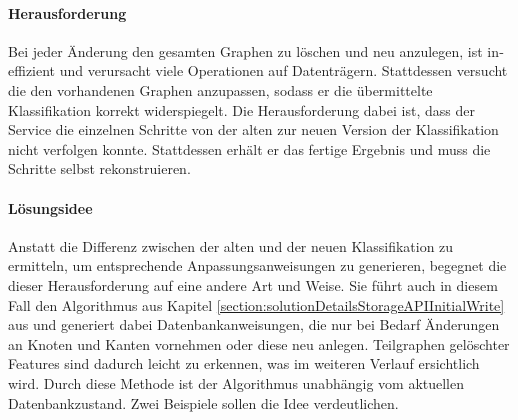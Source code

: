     \paragraph*{Herausforderung}
    Bei jeder Änderung den gesamten Graphen zu löschen und neu anzulegen,
    ist in­ef­fi­zi­ent und verursacht viele Operationen auf Datenträgern.
    Stattdessen versucht die {\classificationStorageAPI} den vorhandenen Graphen anzupassen,
    sodass er die übermittelte Klassifikation korrekt widerspiegelt.
    Die Herausforderung dabei ist, dass der Service
    die einzelnen Schritte von der alten zur neuen Version der Klassifikation nicht verfolgen konnte.
    Stattdessen erhält er das fertige Ergebnis und muss die Schritte selbst rekonstruieren.

    \paragraph*{Lösungsidee}
    Anstatt die Differenz zwischen der alten und der neuen Klassifikation zu ermitteln,
    um entsprechende Anpassungsanweisungen zu generieren,
    begegnet die {\classificationStorageAPI} dieser Herausforderung auf eine andere Art und Weise.
    Sie führt auch in diesem Fall den Algorithmus aus Kapitel \ref{section:solutionDetailsStorageAPIInitialWrite}
    aus und generiert dabei Datenbankanweisungen,
    die nur bei Bedarf Änderungen an Knoten und Kanten vornehmen oder diese neu anlegen.
    Teilgraphen gelöschter Features sind dadurch leicht zu erkennen,
    was im weiteren Verlauf ersichtlich wird.
    Durch diese Methode ist der Algorithmus unabhängig vom aktuellen Datenbankzustand.
    Zwei Beispiele sollen die Idee verdeutlichen.

